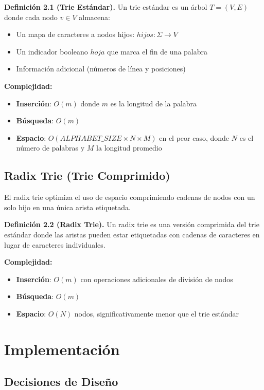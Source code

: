 \documentclass[11pt,a4paper]{article}
\begin{document}
\textbf{Definición 2.1 (Trie Estándar).} Un trie estándar es un árbol $T = (V, E)$ donde cada nodo $v \in V$ almacena:
\begin{itemize}
    \item Un mapa de caracteres a nodos hijos: $hijos : \Sigma \rightarrow V$
    \item Un indicador booleano $hoja$ que marca el fin de una palabra
    \item Información adicional (números de línea y posiciones)
\end{itemize}

\textbf{Complejidad:}
\begin{itemize}
    \item \textbf{Inserción}: $O(m)$ donde $m$ es la longitud de la palabra
    \item \textbf{Búsqueda}: $O(m)$
    \item \textbf{Espacio}: $O(ALPHABET\_SIZE \times N \times M)$ en el peor caso, donde $N$ es el número de palabras y $M$ la longitud promedio
\end{itemize}

\subsection{Radix Trie (Trie Comprimido)}

El radix trie optimiza el uso de espacio comprimiendo cadenas de nodos con un solo hijo en una única arista etiquetada.

\textbf{Definición 2.2 (Radix Trie).} Un radix trie es una versión comprimida del trie estándar donde las aristas pueden estar etiquetadas con cadenas de caracteres en lugar de caracteres individuales.

\textbf{Complejidad:}
\begin{itemize}
    \item \textbf{Inserción}: $O(m)$ con operaciones adicionales de división de nodos
    \item \textbf{Búsqueda}: $O(m)$
    \item \textbf{Espacio}: $O(N)$ nodos, significativamente menor que el trie estándar
\end{itemize}

\section{Implementación}

\subsection{Decisiones de Diseño}
\end{document}
